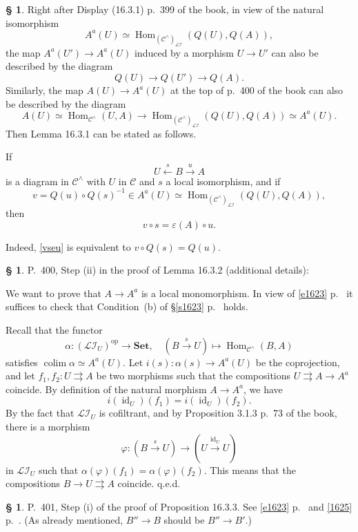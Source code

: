 \documentclass[12pt]{article}
\theoremstyle{remark}
\theoremstyle{definition}
\newtheorem{s}[thm]{\S}
\newcommand{\cc}{\mathcal}
\newcommand{\C}{\mathcal C}
\newcommand{\Set}{\mathbf{Set}}
\newcommand{\ee}{\varepsilon}
\newcommand{\pp}{\varphi}
\newcommand{\parar}{\rightrightarrows}
\newcommand{\xr}{\xrightarrow}
\DeclareMathOperator*{\colim}{colim}
\DeclareMathOperator{\id}{id}
\DeclareMathOperator{\Hom}{Hom}
\DeclareMathOperator{\op}{op}
\begin{document}

\begin{s}
Right after Display (16.3.1) p.~399 of the book, in view of the natural isomorphism 
$$
A^a(U)\simeq\Hom_{({\C^\wedge})_{\cc{LI}}}(Q(U),Q(A)),
$$ 
the map $A^a(U')\to A^a(U)$ induced by a morphism $U\to U'$ can also be described by the diagram 
$$
Q(U)\to Q(U')\to Q(A).
$$ 
Similarly, the map $A(U)\to A^a(U)$ at the top of p.~400 of the book can also be described by the diagram 
$$
A(U)\simeq\Hom_{\C^\wedge}(U,A)\to\Hom_{({\C^\wedge})_{\cc{LI}}}(Q(U),Q(A))\simeq A^a(U).
$$ 
Then Lemma 16.3.1 can be stated as follows. 

If 
$$
U\xleftarrow sB\xr uA
$$ 
is a diagram in $\C^\wedge$ with $U$ in $\C$ and $s$ a local isomorphism, and if 
$$
v=Q(u)\circ Q(s)^{-1}\in A^a(U)\simeq\Hom_{({\C^\wedge})_{\cc{LI}}}(Q(U),Q(A)), 
$$ 
then 
\begin{equation}\label{vseu}
v\circ s=\ee(A)\circ u.
\end{equation}

Indeed, \eqref{vseu} is equivalent to $v\circ Q(s)=Q(u)$.
\end{s}

%

\begin{s} 
P.~400, Step (ii) in the proof of Lemma 16.3.2 (additional details):

We want to prove that $A\to A^a$ is a local monomorphism. In view of \eqref{e1623} p.~\pageref{e1623} it suffices to check that Condition~(b) of \S\ref{s1623} p.~\pageref{s1623} holds. 

Recall that the functor 
$$
\alpha:(\cc{LI}_U)^{\op}\to\Set,\quad(B\xr sU)\mapsto\Hom_{\C^\wedge}(B,A)
$$ 
satisfies $\colim\alpha\simeq A^a(U)$. Let $i(s):\alpha(s)\to A^a(U)$ be the coprojection, and let $f_1,f_2:U\parar A$ be two morphisms such that the compositions $U\parar A\to A^a$ coincide. By definition of the natural morphism $A\to A^a$, we have 
$$
i(\id_U)(f_1)=i(\id_U)(f_2).
$$ 
By the fact that $\cc{LI}_U$ is cofiltrant, and by Proposition 3.1.3 p.~73 of the book, there is a morphism 
$$
\pp:(B\xr sU)\to(U\xr{\id_U}U)
$$ 
in $\cc{LI}_U$ such that $\alpha(\pp)(f_1)=\alpha(\pp)(f_2)$. This means that the compositions $B\to U\parar A$ coincide. q.e.d.
\end{s}

%

\begin{s} P.~401, Step (i) of the proof of Proposition 16.3.3. See \eqref{e1623} p.~\pageref{e1623} and \eqref{1625} p.~\pageref{1625}. (As already mentioned, $B''\to B$ should be $B''\to B'$.)
\end{s}
\end{document}
